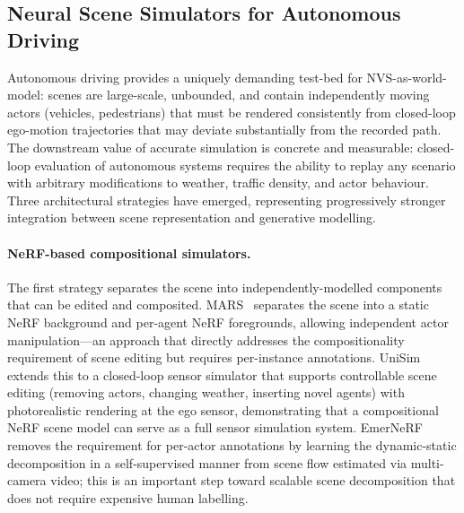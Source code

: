 \subsection{Neural Scene Simulators for Autonomous Driving}

Autonomous driving provides a uniquely demanding test-bed for NVS-as-world-model:
scenes are large-scale, unbounded, and contain independently moving actors
(vehicles, pedestrians) that must be rendered consistently from closed-loop
ego-motion trajectories that may deviate substantially from the recorded path.
The downstream value of accurate simulation is concrete and measurable:
closed-loop evaluation of autonomous systems requires the ability to replay
any scenario with arbitrary modifications to weather, traffic density, and
actor behaviour.
Three architectural strategies have emerged, representing progressively stronger
integration between scene representation and generative modelling.

\paragraph{NeRF-based compositional simulators.}
The first strategy separates the scene into independently-modelled components
that can be edited and composited.
MARS~\citep{wu2023mars} separates the scene into a static NeRF background
and per-agent NeRF foregrounds, allowing independent actor manipulation---an
approach that directly addresses the compositionality requirement of scene
editing but requires per-instance annotations.
UniSim~\citep{yang2023unisim} extends this to a closed-loop sensor simulator
that supports controllable scene editing (removing actors, changing weather,
inserting novel agents) with photorealistic rendering at the ego sensor,
demonstrating that a compositional NeRF scene model can serve as a full
sensor simulation system.
EmerNeRF~\citep{yang2023emernerf} removes the requirement for per-actor
annotations by learning the dynamic-static decomposition in a self-supervised
manner from scene flow estimated via multi-camera video; this is an important
step toward scalable scene decomposition that does not require expensive
human labelling.

